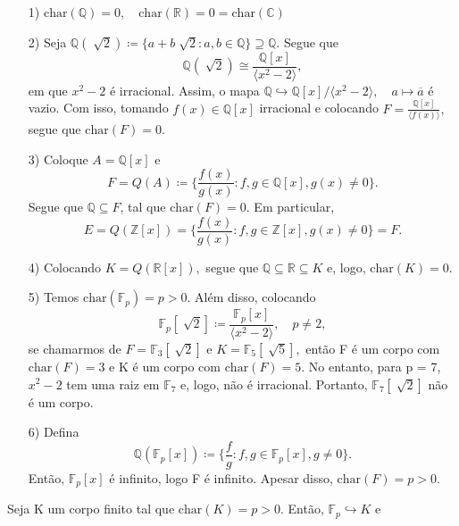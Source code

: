\documentclass[AlgebraII/algebraII_notes.tex]{subfiles}
\begin{document}
\begin{example}
	\begin{itemize}
		\item[1)] \(\mathrm{char}(\mathbb{Q}) = 0,\quad \mathrm{char}(\mathbb{R})=0 = \mathrm{char}(\mathbb{C})\)
		\item[2)] Seja \(\mathbb{Q}(\sqrt[]{2})\coloneqq \{a + b\sqrt[]{2}: a, b\in \mathbb{Q}\}\supseteq{\mathbb{Q}}.\) Segue que
		      \[
			      \mathbb{Q}(\sqrt[]{2})\cong{\frac{\mathbb{Q}[x]}{\langle x^{2}-2 \rangle}},
		      \]
		      em que \(x^{2}-2\) é irracional. Assim, o mapa \(\mathbb{Q}\hookrightarrow \mathbb{Q}[x]/\langle x^{2}-2 \rangle,\quad a\mapsto \overline{a}\) é vazio.
		      Com isso, tomando \(f(x)\in \mathbb{Q}[x]\) irracional e colocando \(F = \frac{\mathbb{Q}[x]}{\langle f(x) \rangle},\)
		      segue que \(\mathrm{char}(F) = 0.\)
		\item[3)] Coloque \(A = \mathbb{Q}[x]\) e
		      \[
			      F = Q(A)\coloneqq \biggl\{\frac{f(x)}{g(x)}: f, g\in \mathbb{Q}[x], g(x)\neq0\biggr\}.
		      \]
		      Segue que \(\mathbb{Q}\subseteq{F}\), tal que \(\mathrm{char}(F) = 0\). Em particular,
		      \[
			      E = Q(\mathbb{Z}[x]) = \biggl\{\frac{f(x)}{g(x)}:f, g\in \mathbb{Z}[x], g(x)\neq0\biggr\} = F.
		      \]
		\item[4)] Colocando \(K = Q(\mathbb{R}[x]),\) segue que \(\mathbb{Q} \subseteq{\mathbb{R}}\subseteq{K}\) e, logo, \(\mathrm{char}(K) = 0.\)
		\item[5)] Temos \(\mathrm{char}(\mathbb{F}_{p}) = p > 0.\) Além disso, colocando
		      \[
			      \mathbb{F}_{p}[\sqrt[]{2}]\coloneqq \frac{\mathbb{F}_{p}[x]}{\langle x^{2}-2 \rangle},\quad p\neq2,
		      \]
		      se chamarmos de \(F = \mathbb{F}_{3}[\sqrt[]{2}]\) e \(K = \mathbb{F}_{5}[\sqrt[]{5}],\) então
		      F é um corpo com \(\mathrm{char}(F) = 3\) e K é um corpo com \(\mathrm{char}(F) = 5.\) No entanto, para p = 7,
		      \(x^{2}-2\) tem uma raiz em \(\mathbb{F}_{7}\) e, logo, não é irracional. Portanto, \(\mathbb{F}_{7}[\sqrt[]{2}]\) não é um
		      corpo.
		\item[6)] Defina
		      \[
			      \mathbb{Q}(\mathbb{F}_{p}[x])\coloneqq \biggl\{\frac{f}{g}: f, g\in \mathbb{F}_{p}[x], g\neq 0\biggr\}.
		      \]
		      Então, \(\mathbb{F}_{p}[x]\) é infinito, logo F é infinito. Apesar disso, \(\mathrm{char}(F) = p > 0.\)
	\end{itemize}
\end{example}
Seja K um corpo finito tal que \(\mathrm{char}(K) = p > 0.\) Então, \(\mathbb{F}_{p}\hookrightarrow K\) e
\end{document}
